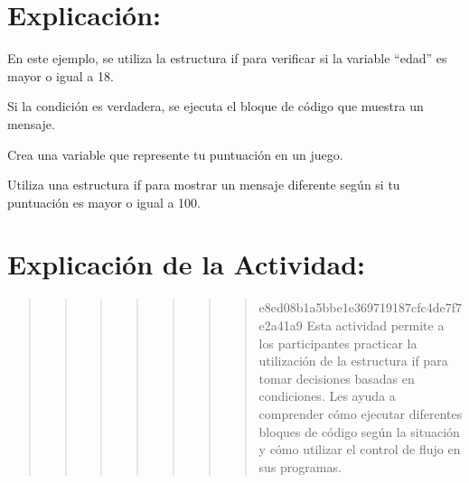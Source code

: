 \documentclass[
  a4paper,
  onepage,
  openany]{scrreprt}
\begin{document}
\hypertarget{explicaciuxf3n-29}{%
\section{Explicación:}\label{explicaciuxf3n-29}}

En este ejemplo, se utiliza la estructura if para verificar si la
variable ``edad'' es mayor o igual a 18.

Si la condición es verdadera, se ejecuta el bloque de código que muestra
un mensaje.

\begin{tcolorbox}[enhanced jigsaw, breakable, opacityback=0, toptitle=1mm, coltitle=black, toprule=.15mm, rightrule=.15mm, colframe=quarto-callout-important-color-frame, opacitybacktitle=0.6, arc=.35mm, title=\textcolor{quarto-callout-important-color}{\faExclamation}\hspace{0.5em}{Actividad Práctica:}, titlerule=0mm, colbacktitle=quarto-callout-important-color!10!white, bottomtitle=1mm, bottomrule=.15mm, colback=white, left=2mm, leftrule=.75mm]

Crea una variable que represente tu puntuación en un juego.

Utiliza una estructura if para mostrar un mensaje diferente según si tu
puntuación es mayor o igual a 100.

\end{tcolorbox}

\hypertarget{explicaciuxf3n-de-la-actividad-27}{%
\section{Explicación de la
Actividad:}\label{explicaciuxf3n-de-la-actividad-27}}

\begin{quote}
\begin{quote}
\begin{quote}
\begin{quote}
\begin{quote}
\begin{quote}
\begin{quote}
e8ed08b1a5bbe1e369719187cfc4de7f7e2a41a9 Esta actividad permite a los
participantes practicar la utilización de la estructura if para tomar
decisiones basadas en condiciones. Les ayuda a comprender cómo ejecutar
diferentes bloques de código según la situación y cómo utilizar el
control de flujo en sus programas.
\end{quote}
\end{quote}
\end{quote}
\end{quote}
\end{quote}
\end{quote}
\end{quote}
\end{document}
